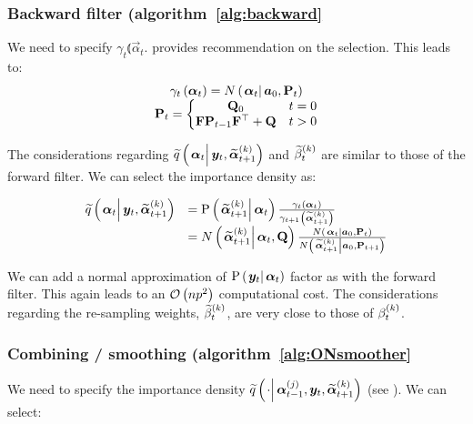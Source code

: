 \subsubsection*{Backward filter (algorithm~\ref{alg:backward}}
We need to specify $\gamma_t\Lparen{\vec{\alpha}_t}$. \citet[page 69 and 70]{briers10} provides recommendation on the selection. This leads to:
\begin{equation}\begin{matrix}
	\gamma_t\Lparen{\vec{\alpha}_t} =
		\normalC{\vec{\alpha}_t}{\vec{a}_0}{\mat{P}_t} \\
%
	\mat{P}_t = \left\{
		\begin{matrix} \mat{Q}_0 & t = 0 \\ \mat{F}\mat{P}_{t - 1}\mat{F}^\top + \mat{Q} & t > 0   \end{matrix} \right.
\end{matrix}\end{equation}

The considerations regarding $\IDAproxC{\vec{\alpha}_t}{\vec{y}_t, \particB{\vec{\alpha}}{t + 1}{k}}$ and $\widetilde{\beta}_{t}^{\left( k\right)}$ are similar to those of the forward filter. We can select the importance density as:

\begin{equation}\begin{array}{cl}
	\IDAproxC{\vec{\alpha}_t}{\vec{y}_t, \particB{\vec{\alpha}}{t + 1}{k}}  &= %
		\propC{\particB{\vec{\alpha}}{t + 1}{k}}{\vec{\alpha}_t}
		\frac{\gamma_t\Lparen{\vec{\alpha}_t}}{\gamma_{t + 1}\Lparen{\particB{\vec{\alpha}}{t + 1}{k}}} \\
	& = \normalC{\particB{\vec{\alpha}}{t + 1}{k}}{\vec{\alpha}_t}{\mat{Q}}
		\frac{
			\normalC{\vec{\alpha}_t}{\vec{a}_0}{\mat{P}_t}
		}{ %
			\normalC{\particB{\vec{\alpha}}{t + 1}{k}}{\vec{a}_0}{\mat{P}_{t + 1}}
		}
\end{array}\end{equation}

We can add a normal approximation of $\propC{\vec{y}_t}{\vec{\alpha}_t}$ factor as with the forward filter. This again leads to an $\mathcal{O}\left( np^2\right)$ computational cost. The considerations regarding the re-sampling weights, $\widetilde{\beta}_{t}^{\left( k\right)}$, are very close to those of $\beta_{t}^{\left( k\right)}$.

\subsubsection*{Combining / smoothing (algorithm~\ref{alg:ONsmoother}}
We need to specify the importance density $\IDAproxC{\cdot}{\partic{\vec{\alpha}}{t-1}{j},\vec{y}_t, \particB{\vec{\alpha}}{t+1}{k}}$ (see \citet[page 453] {fearnhead10}). We can select:

